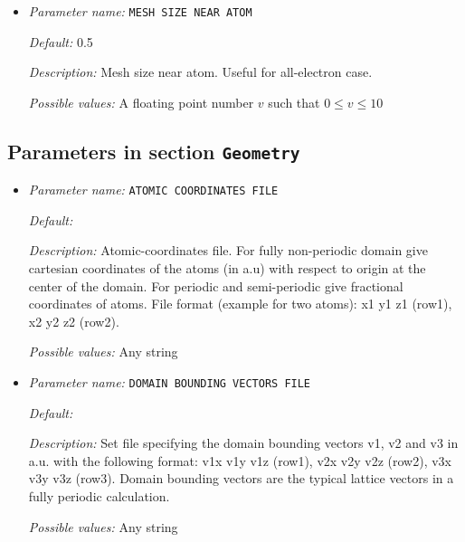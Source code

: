 \begin{itemize}
{\it Default:} 0.5


{\it Description:} Mesh size in a ball around atom


{\it Possible values:} A floating point number $v$ such that $0 \leq v \leq 10$
\item {\it Parameter name:} {\tt MESH SIZE NEAR ATOM}
\label{parameters:Finite element mesh parameters/Auto mesh generation parameters/MESH SIZE NEAR ATOM}
\label{parameters:Finite_20element_20mesh_20parameters/Auto_20mesh_20generation_20parameters/MESH_20SIZE_20NEAR_20ATOM}


{\it Default:} 0.5


{\it Description:} Mesh size near atom. Useful for all-electron case.


{\it Possible values:} A floating point number $v$ such that $0 \leq v \leq 10$
\end{itemize}

\subsection{Parameters in section \tt Geometry}
\label{parameters:Geometry}

\begin{itemize}
\item {\it Parameter name:} {\tt ATOMIC COORDINATES FILE}
\label{parameters:Geometry/ATOMIC COORDINATES FILE}
\label{parameters:Geometry/ATOMIC_20COORDINATES_20FILE}


{\it Default:} 


{\it Description:} Atomic-coordinates file. For fully non-periodic domain give cartesian coordinates of the atoms (in a.u) with respect to origin at the center of the domain. For periodic and semi-periodic give fractional coordinates of atoms. File format (example for two atoms): x1 y1 z1 (row1), x2 y2 z2 (row2).


{\it Possible values:} Any string
\item {\it Parameter name:} {\tt DOMAIN BOUNDING VECTORS FILE}
\label{parameters:Geometry/DOMAIN BOUNDING VECTORS FILE}
\label{parameters:Geometry/DOMAIN_20BOUNDING_20VECTORS_20FILE}


{\it Default:} 


{\it Description:} Set file specifying the domain bounding vectors v1, v2 and v3 in a.u. with the following format: v1x v1y v1z (row1), v2x v2y v2z (row2), v3x v3y v3z (row3). Domain bounding vectors are the typical lattice vectors in a fully periodic calculation.


{\it Possible values:} Any string
\end{itemize}



